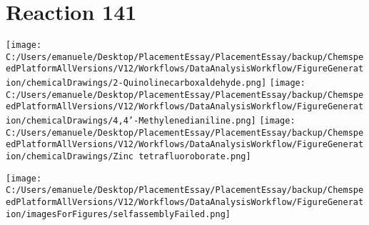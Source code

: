 \documentclass{article}%
\begin{document}
\section*{Reaction 141}%
%
\begin{scheme}[H]%
\begin{minipage}{0.5\textwidth}%
\texttt{[image: C:/Users/emanuele/Desktop/PlacementEssay/PlacementEssay/backup/ChemspeedPlatformAllVersions/V12/Workflows/DataAnalysisWorkflow/FigureGeneration/chemicalDrawings/2-Quinolinecarboxaldehyde.png]}%
\texttt{[image: C:/Users/emanuele/Desktop/PlacementEssay/PlacementEssay/backup/ChemspeedPlatformAllVersions/V12/Workflows/DataAnalysisWorkflow/FigureGeneration/chemicalDrawings/4,4'-Methylenedianiline.png]}%
\texttt{[image: C:/Users/emanuele/Desktop/PlacementEssay/PlacementEssay/backup/ChemspeedPlatformAllVersions/V12/Workflows/DataAnalysisWorkflow/FigureGeneration/chemicalDrawings/Zinc tetrafluoroborate.png]}%
\end{minipage}%
\begin{minipage}{0.5\textwidth}%
\begin{center}%
\texttt{[image: C:/Users/emanuele/Desktop/PlacementEssay/PlacementEssay/backup/ChemspeedPlatformAllVersions/V12/Workflows/DataAnalysisWorkflow/FigureGeneration/imagesForFigures/selfassemblyFailed.png]}%
\end{center}%
\end{minipage}%
\caption{Self-assembly of components 4, 17, with Zinc(II) in a 3.0:1.5:1.0 molar ratio in CH$_3$CN at 60\textdegree C for 40h. These are the reagents (starting materials) for reaction 141.}%
\end{scheme}%
\end{document}
